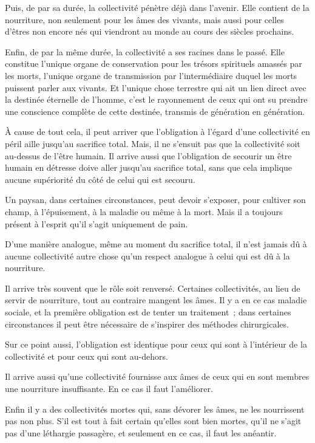 \documentclass[french,twoside]{book} %
\begin{document}
Puis, de par sa durée, la collectivité pénètre déjà dans l'avenir. Elle contient de la nourriture, non seulement pour les âmes des vivants, mais aussi pour celles d'êtres non encore nés qui viendront au monde au cours des siècles prochains.\par
Enfin, de par la même durée, la collectivité a ses racines dans le passé. Elle constitue l'unique organe de conservation pour les trésors spirituels amassés par les morts, l'unique organe de transmission par l'intermédiaire duquel les morts puissent parler aux vivants. Et l'unique chose terrestre qui ait un lien direct avec la destinée éternelle de l'homme, c'est le rayonnement de ceux qui ont su prendre une conscience complète de cette destinée, transmis de génération en génération.\par
À cause de tout cela, il peut arriver que l'obligation à l'égard d'une collectivité en péril aille jusqu'au sacrifice total. Mais, il ne s'ensuit pas que la collectivité soit au-dessus de l'être humain. Il arrive aussi que l'obligation de secourir un être humain en détresse doive aller jusqu'au sacrifice total, sans que cela implique aucune supériorité du côté de celui qui est secouru.\par
Un paysan, dans certaines circonstances, peut devoir s'exposer, pour cultiver son champ, à l'épuisement, à la maladie ou même à la mort. Mais il a toujours présent à l'esprit qu'il s'agit uniquement de pain.\par
D'une manière analogue, même au moment du sacrifice total, il n'est jamais dû à aucune collectivité autre chose qu'un respect analogue à celui qui est dû à la nourriture.\par
Il arrive très souvent que le rôle soit renversé. Certaines collectivités, au lieu de servir de nourriture, tout au contraire mangent les âmes. Il y a en ce cas maladie sociale, et la première obligation est de tenter un traitement ; dans certaines circonstances il peut être nécessaire de s'inspirer des méthodes chirurgicales.\par
Sur ce point aussi, l'obligation est identique pour ceux qui sont à l'intérieur de la collectivité et pour ceux qui sont au-dehors.\par
Il arrive aussi qu'une collectivité fournisse aux âmes de ceux qui en sont membres une nourriture insuffisante. En ce cas il faut l'améliorer.\par
Enfin il y a des collectivités mortes qui, sans dévorer les âmes, ne les nourrissent pas non plus. S'il est tout à fait certain qu'elles sont bien mortes, qu'il ne s'agit pas d'une léthargie passagère, et seulement en ce cas, il faut les anéantir.\par
\end{document}
